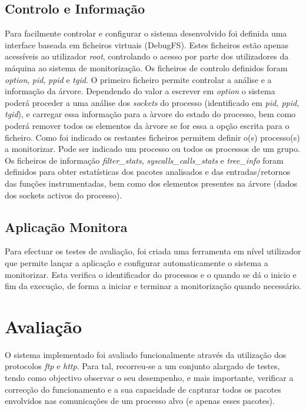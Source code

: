 \documentclass[a4paper]{llncs}
\begin{document}
\subsection*{Controlo e Informação}
\label{sub:data_information}

Para facilmente controlar e configurar o sistema desenvolvido foi definida uma interface baseada em ficheiros virtuais (DebugFS). Estes ficheiros estão apenas acessíveis ao utilizador \textit{root}, controlando o acesso por parte dos utilizadores da máquina ao sistema de monitorização. Os ficheiros de controlo definidos foram \textit{option}, \textit{pid}, \textit{ppid} e \textit{tgid}. O primeiro ficheiro permite controlar a análise e a informação da árvore. Dependendo do valor a escrever em \textit{option} o sistema poderá proceder a uma análise dos \textit{sockets} do processo (identificado em \textit{pid, ppid, tgid}), e carregar essa informação para a àrvore do estado do processo, bem como poderá remover todos os elementos da àrvore se for essa a opção escrita para o ficheiro. Como foi indicado os restantes ficheiros permitem definir o(s) processo(s) a monitorizar. Pode ser indicado um processo ou todos os processos de um grupo. Os ficheiros de informação \textit{filter\_stats},  \textit{syscalls\_calls\_stats} e \textit{tree\_info} foram definidos para obter estatísticas dos pacotes analisados e das entradas/retornos das funções instrumentadas, bem como dos elementos presentes na árvore (dados dos sockets activos do processo).


\subsection{Aplicação Monitora}
\label{sub:monitor_app}

Para efectuar os testes de avaliação, foi criada uma ferramenta em nível utilizador que permite lançar a aplicação e configurar automaticamente o sistema a monitorizar.
 Esta verifica o identificador do processos e o quando se dá o inicio e fim da execução, de forma a iniciar e terminar a monitorização quando necessário.



\section{Avaliação}
\label{sec:evaluation}

O sistema implementado foi avaliado funcionalmente através da utilização dos protocolos \textit{ftp} e \textit{http}.
 Para tal, recorreu-se a um conjunto alargado de testes, tendo como objectivo observar o seu desempenho, e mais importante, verificar a correcção do funcionamento e a sua capacidade de capturar todos os pacotes envolvidos nas comunicações de um processo alvo (e apenas esses pacotes). 
\end{document}
